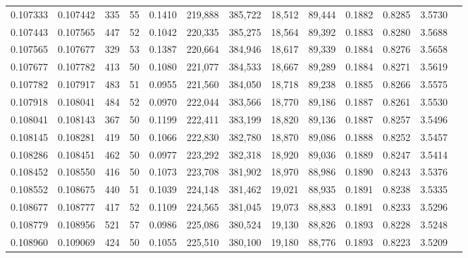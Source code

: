 \begin{tabular}{rrrrrrrrrrrrr}
0.107333 & 0.107442 &   335 &  55 &                                     0.1410 & 219,888 & 385,722 &  18,512 &  89,444 & 0.1882 & 0.8285 & 3.5730 \\
0.107443 & 0.107565 &   447 &  52 &                                     0.1042 & 220,335 & 385,275 &  18,564 &  89,392 & 0.1883 & 0.8280 & 3.5688 \\
0.107565 & 0.107677 &   329 &  53 &                                     0.1387 & 220,664 & 384,946 &  18,617 &  89,339 & 0.1884 & 0.8276 & 3.5658 \\
0.107677 & 0.107782 &   413 &  50 &                                     0.1080 & 221,077 & 384,533 &  18,667 &  89,289 & 0.1884 & 0.8271 & 3.5619 \\
0.107782 & 0.107917 &   483 &  51 &                                     0.0955 & 221,560 & 384,050 &  18,718 &  89,238 & 0.1885 & 0.8266 & 3.5575 \\
0.107918 & 0.108041 &   484 &  52 &                                     0.0970 & 222,044 & 383,566 &  18,770 &  89,186 & 0.1887 & 0.8261 & 3.5530 \\
0.108041 & 0.108143 &   367 &  50 &                                     0.1199 & 222,411 & 383,199 &  18,820 &  89,136 & 0.1887 & 0.8257 & 3.5496 \\
0.108145 & 0.108281 &   419 &  50 &                                     0.1066 & 222,830 & 382,780 &  18,870 &  89,086 & 0.1888 & 0.8252 & 3.5457 \\
0.108286 & 0.108451 &   462 &  50 &                                     0.0977 & 223,292 & 382,318 &  18,920 &  89,036 & 0.1889 & 0.8247 & 3.5414 \\
0.108452 & 0.108550 &   416 &  50 &                                     0.1073 & 223,708 & 381,902 &  18,970 &  88,986 & 0.1890 & 0.8243 & 3.5376 \\
0.108552 & 0.108675 &   440 &  51 &                                     0.1039 & 224,148 & 381,462 &  19,021 &  88,935 & 0.1891 & 0.8238 & 3.5335 \\
0.108677 & 0.108777 &   417 &  52 &                                     0.1109 & 224,565 & 381,045 &  19,073 &  88,883 & 0.1891 & 0.8233 & 3.5296 \\
0.108779 & 0.108956 &   521 &  57 &                                     0.0986 & 225,086 & 380,524 &  19,130 &  88,826 & 0.1893 & 0.8228 & 3.5248 \\
0.108960 & 0.109069 &   424 &  50 &                                     0.1055 & 225,510 & 380,100 &  19,180 &  88,776 & 0.1893 & 0.8223 & 3.5209 \\

\end{tabular}
